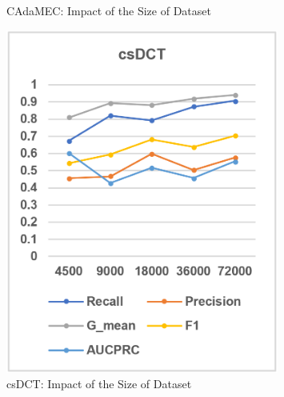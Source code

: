 \begin{figure}[h]
\begin{minipage}{0.31\textwidth}
        \caption{CAdaMEC: Impact of the Size of Dataset}
        \label{fig22}
    \end{minipage}
    \hspace{5pt}
    \begin{minipage}{0.31\textwidth}
        \centering
        \includegraphics[width=0.8\textwidth]{images/fig23}
        \caption{csDCT: Impact of the Size of Dataset}
        \label{fig23}
    \end{minipage}
\end{figure}
\vspace{-10pt}

